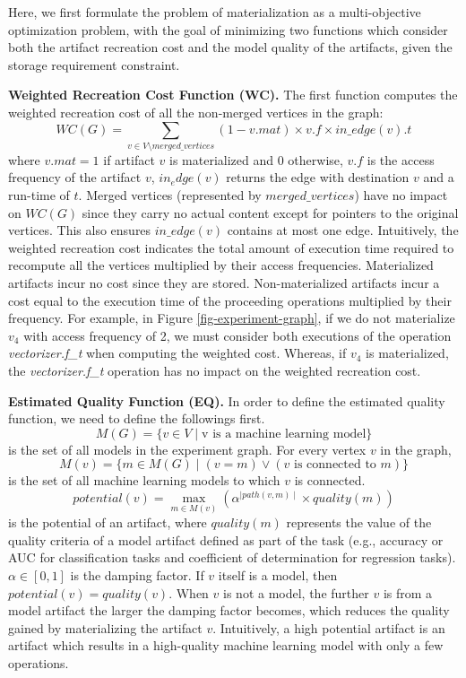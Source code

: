 Here, we first formulate the problem of materialization as a multi-objective optimization problem, with the goal of minimizing two functions which consider both the artifact recreation cost and the model quality of the artifacts, given the storage requirement constraint.

\textbf{Weighted Recreation Cost Function (WC).} 
The first function computes the weighted recreation cost of all the non-merged vertices in the graph:
\[
WC(G) =  \sum\limits_{v \in V\setminus merged\_vertices}  (1-v.mat) \times v.f \times in\_edge(v).t
\]
where $v.mat = 1$ if artifact $v$ is materialized and $0$ otherwise, $v.f$ is the access frequency of the artifact $v$, $in_edge(v)$ returns the edge with destination $v$ and a run-time of $t$.
Merged vertices (represented by $merged\_vertices$) have no impact on $WC(G)$ since they carry no actual content except for pointers to the original vertices.
This also ensures $in\_edge(v)$ contains at most one edge.
Intuitively, the weighted recreation cost indicates the total amount of execution time required to recompute all the vertices multiplied by their access frequencies.
Materialized artifacts incur no cost since they are stored.
Non-materialized artifacts incur a cost equal to the execution time of the proceeding operations multiplied by their frequency.
For example, in Figure \ref{fig-experiment-graph}, if we do not materialize $v_4$ with access frequency of 2, we must consider both executions of the operation \textit{vectorizer.f\_t}  when computing the weighted cost.
Whereas, if $v_4$ is materialized, the \textit{vectorizer.f\_t} operation has no impact on the weighted recreation cost.

\textbf{Estimated Quality Function (EQ).} 
In order to define the estimated quality function, we need to define the followings first.
\[
M(G) = \{v \in V \mid \text{v is a machine learning model}\}
\]
is the set of all models in the experiment graph.
For every vertex $v$ in the graph, 
\[
M(v) = \{m \in M(G) \mid (v = m) \vee (v \text{ is connected to } m)\}
\]
is the set of all machine learning models to which $v$ is connected.
\[
potential(v) = \max\limits_{m \in M(v)} ( \alpha ^ {\mid path(v,m) \mid} \times quality(m) )
\]
is the potential of an artifact, where $quality(m)$ represents the value of the quality criteria of a model artifact defined as part of the task (e.g., accuracy or AUC for classification tasks and coefficient of determination for regression tasks).
$\alpha \in [0,1]$ is the damping factor.
If $v$ itself is a model, then $potential(v) = quality(v)$.
When $v$ is not a model, the further $v$ is from a model artifact the larger the damping factor becomes, which reduces the quality gained by materializing the artifact $v$.
Intuitively, a high potential artifact is an artifact which results in a high-quality machine learning model with only a few operations.


